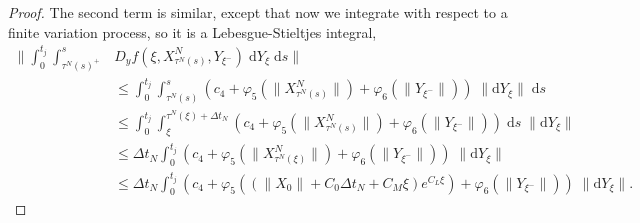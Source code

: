 \documentclass[reqno,12pt]{amsart}
\theoremstyle{plain} %
\theoremstyle{definition} %
\begin{document}
\begin{proof}
    The second term is similar, except that now we integrate with respect to a finite variation process, so it is a Lebesgue-Stieltjes integral,
    \begin{align*}
        \bigg\|\int_0^{t_j} \int_{\tau^N(s)^+}^s & D_y f(\xi, X_{\tau^N(s)}^N, Y_{\xi^-}) \;\mathrm{d}Y_\xi\;\mathrm{d}s\bigg\| \\
        & \leq \int_0^{t_j} \int_{\tau^N(s)}^s \left(c_4 + \varphi_5 (\|X_{\tau^N(s)}^N\|) + \varphi_6(\|Y_{\xi^-}\|)\right)\;\|\mathrm{d}Y_\xi\|\;\mathrm{d}s \\
        & \leq \int_0^{t_j} \int_{\xi}^{\tau^N(\xi) + \Delta t_N} \left(c_4 + \varphi_5(\|X_{\tau^N(s)}^N\|) + \varphi_6(\|Y_{\xi^-}\|)\right)\;\mathrm{d}s\;\|\mathrm{d}Y_\xi\| \\
        & \leq \Delta t_N\int_0^{t_j} \left(c_4 + \varphi_5(\|X_{\tau^N(\xi)}^N\|) + \varphi_6(\|Y_{\xi^-}\|)\right)\;\|\mathrm{d}Y_\xi\| \\
        & \leq \Delta t_N\int_0^{t_j} \left(c_4 + \varphi_5\left(\left(\|X_0\| + C_0\Delta t_N + C_M \xi \right)e^{C_L \xi}\right) + \varphi_6(\|Y_{\xi^-}\|)\right)\;\|\mathrm{d}Y_\xi\|.
    \end{align*}


\end{proof}
\end{document}
